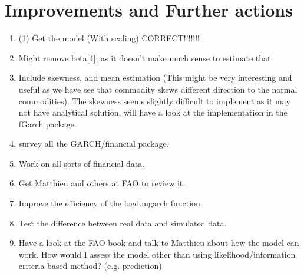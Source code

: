 \documentclass[a4paper, 12pts]{article}
\begin{document}
\section{Improvements and Further actions}
\begin{enumerate}
  \item (1) Get the model (With scaling) CORRECT!!!!!!!
  \item Might remove beta[4], as it doesn't make much sense to
    estimate that.
  \item Include skewness, and mean estimation (This might be very
    interesting and useful as we have see that commodity skews
    different direction to the normal commodities). The skewness seems
    slightly difficult to implement as it may not have analytical
    solution, will have a look at the implementation in the fGarch
    package.
  \item survey all the GARCH/financial package.
  \item Work on all sorts of financial data.
  \item Get Matthieu and others at FAO to review it.
  \item Improve the efficiency of the logd.mgarch function.
  \item Test the difference between real data and simulated data.
  \item Have a look at the FAO book and talk to Matthieu about how the
    model can work. How would I assess the model other than using
    likelihood/information criteria based method? (e.g. prediction)
\end{enumerate}
\end{document}
